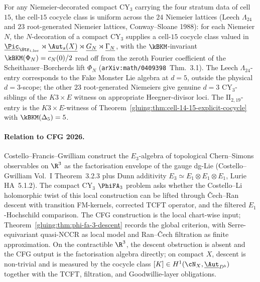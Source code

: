 \begin{corollary}
\label{gluing:cor:niemeier-uniform-cell-15}
For any Niemeier-decorated compact CY$_3$ carrying the four stratum
data of cell \(15\), the cell-$15$ cocycle class is uniform across the
$24$ Niemeier lattices (Leech
$\Lambda_{24}$ and $23$ root-generated Niemeier lattices,
Conway--Sloane 1988): for each Niemeier $N$, the $N$-decoration of a
compact CY$_{3}$ supplies a cell-$15$ cocycle class valued in
$\underline{\Pic}_{\Str_{i,\mathrm{loc}}}\rtimes\underline{\Aut_{s}(X)}
\rtimes\underline{G_{N}}\rtimes\underline{\Gamma_{N}}$, with the
$\kBKM$-invariant $\kBKM(\Phi_N) = c_{N}(0)/2$ read off from
the zeroth Fourier coefficient of the Scheithauer--Borcherds lift
$\Phi_{N}$ (\texttt{arXiv:math/0409398}~Thm.~3.1). The Leech
$\Lambda_{24}$-entry corresponds to the Fake Monster Lie algebra at
$d=5$, outside the physical $d=3$-scope; the
other $23$ root-generated Niemeiers give genuine $d=3$ CY$_{3}$-siblings
of the $K3\times E$ witness on appropriate Heegner-divisor loci. The
$\mathrm{II}_{2,19}$-entry is the $K3\times E$-witness of
Theorem~\ref{gluing:thm:cell-14-15-explicit-cocycle} with
$\kBKM(\Delta_{5})=5$.
\end{corollary}

\paragraph{Relation to CFG 2026.} Costello--Francis--Gwilliam
construct the $E_{3}$-algebra of topological Chern--Simons
observables on $\R^{3}$ as the factorisation envelope of the gauge
dg-Lie (Costello--Gwilliam Vol.~I Theorem~3.2.3 plus Dunn additivity
$E_{3}\simeq E_{1}\otimes E_{1}\otimes E_{1}$, Lurie HA~5.1.2). The
compact CY$_{3}$ $\PhiFA_{3}$ problem asks whether the Costello--Li
holomorphic twist of this local construction can be lifted through
\v{C}ech--Ran descent with transition FM-kernels, corrected TCFT
operator, and the filtered \(E_1\)-Hochschild comparison. The CFG
construction is the local chart-wise input;
Theorem~\ref{gluing:thm:phi-fa-3-descent} records the global criterion,
with Serre-equivariant quasi-NCCR as local model and Ran--\v{C}ech
filtration as finite approximation. On the contractible
$\R^{3}$, the descent obstruction is absent and the CFG output is the
factorisation algebra directly; on compact $X$, descent is non-trivial
and is measured by the cocycle class
$[K]\in H^{1}(\cN_{X},\underline{\Aut}_{D^{b}})$ together with the
TCFT, filtration, and Goodwillie-layer obligations.

